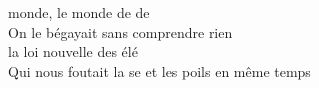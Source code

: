  monde, le monde de de \\
On le bégayait  sans  comprendre rien \\
 la loi nouvelle des élé \\
Qui nous foutait la se et \songwordfb{} les poils en même temps \\

